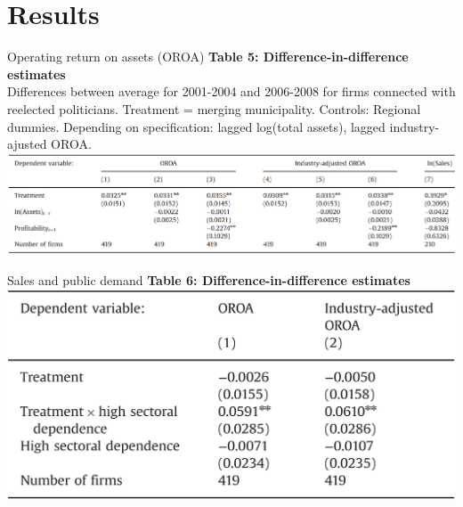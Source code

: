 \documentclass[8pt]{beamer}
\begin{document}
\section{Results}


\begin{frame}{Operating return on assets (OROA)}
  \textbf{Table 5: Difference-in-difference estimates}\\
  Differences between average for 2001-2004 and 2006-2008 for firms connected with reelected politicians. Treatment = merging municipality. Controls: Regional dummies. Depending on specification: lagged log(total assets), lagged industry-ajusted OROA.
  \includegraphics[width= \textwidth]{OROA.PNG}
\end{frame}


\begin{frame}{Sales and public demand}
  \textbf{Table 6: Difference-in-difference estimates}
  \includegraphics[width= \textwidth]{dependence.PNG}
\end{frame}
\end{document}
